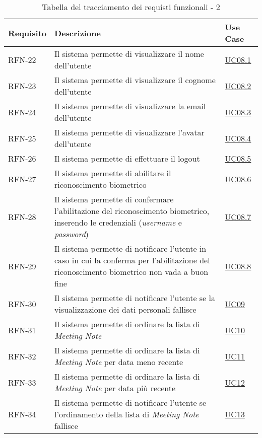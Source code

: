\clearpage

\begin{table}%
\caption{Tabella del tracciamento dei requisti funzionali - 2}
\label{tab:requisiti-funzionali-2}
\begin{tabularx}{\textwidth}{lXl}
\hline\hline
\textbf{Requisito} & \textbf{Descrizione} & \textbf{Use Case}\\
\hline
RFN-22 \label{RFN-22} & Il sistema permette di visualizzare il nome dell'utente & \hyperref[UC08.1]{UC08.1} \\
\hline
RFN-23 \label{RFN-23} & Il sistema permette di visualizzare il cognome dell'utente & \hyperref[UC08.2]{UC08.2} \\
\hline
RFN-24 \label{RFN-24} & Il sistema permette di visualizzare la email dell'utente & \hyperref[UC08.3]{UC08.3} \\
\hline
RFN-25 \label{RFN-25} & Il sistema permette di visualizzare l'avatar dell'utente & \hyperref[UC08.4]{UC08.4} \\
\hline
RFN-26 \label{RFN-26} & Il sistema permette di effettuare il logout & \hyperref[UC08.5]{UC08.5} \\
\hline
RFN-27 \label{RFN-27} & Il sistema permette di abilitare il riconoscimento biometrico & \hyperref[UC08.6]{UC08.6} \\
\hline
RFN-28 \label{RFN-28} & Il sistema permette di confermare l'abilitazione del riconoscimento biometrico, inserendo le credenziali (\emph{username} e \emph{password}) & \hyperref[UC08.7]{UC08.7} \\
\hline
RFN-29 \label{RFN-29} & Il sistema permette di notificare l'utente in caso in cui la conferma per l'abilitazione del riconoscimento biometrico non vada a buon fine & \hyperref[UC08.8]{UC08.8} \\
\hline
RFN-30 \label{RFN-30} & Il sistema permette di notificare l'utente se la visualizzazione dei dati personali fallisce & \hyperref[UC09]{UC09} \\
\hline
RFN-31 \label{RFN-31} & Il sistema permette di ordinare la lista di \emph{Meeting Note} & \hyperref[UC10]{UC10} \\
\hline
RFN-32 \label{RFN-32} & Il sistema permette di ordinare la lista di \emph{Meeting Note} per data meno recente & \hyperref[UC11]{UC11} \\
\hline
RFN-33 \label{RFN-33} & Il sistema permette di ordinare la lista di \emph{Meeting Note} per data più recente & \hyperref[UC12]{UC12} \\
\hline
RFN-34 \label{RFN-34} & Il sistema permette di notificare l'utente se l'ordinamento della lista di \emph{Meeting Note} fallisce & \hyperref[UC13]{UC13} \\

\end{tabularx}
\end{table}
